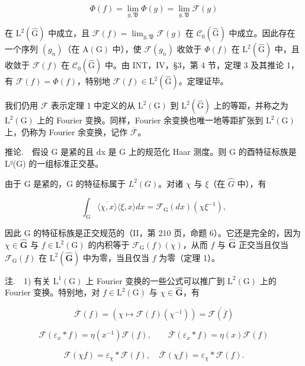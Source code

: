 \[
\Phi (f) = \lim _ {g, \mathfrak {B}} \Phi (g) = \lim _ {g, \mathfrak {B}} \mathcal {F} (g)
\]

在 \(\mathrm{L}^{2}(\widehat{\mathrm{G}})\) 中成立，且 \(\mathcal{F}(f)=\lim_{g,\mathfrak{B}}\mathcal{F}(g)\) 在 \(\mathcal{C}_{0}(\widehat{\mathrm{G}})\) 中成立。因此存在一个序列 \((g_{n})\)（在 \(\mathrm{A}(\mathrm{G})\) 中），使 \(\mathcal{F}(g_{n})\) 收敛于 \(\Phi(f)\) 在 \(\mathrm{L}^{2}(\widehat{\mathrm{G}})\) 中，且收敛于 \(\mathcal{F}(f)\) 在 \(\mathcal{C}_{0}(\widehat{\mathrm{G}})\) 中。由 INT，IV，§3，第 4 节，定理 3 及其推论 1，有 \(\mathcal{F}(f)=\Phi(f)\)，特别地 \(\mathcal{F}(f)\in\mathrm{L}^{2}(\widehat{\mathrm{G}})\)。定理证毕。

我们仍用 \(\mathcal{F}\) 表示定理 1 中定义的从 \(\mathrm{L}^2 (\mathrm{G})\) 到 \(\mathrm{L}^2 (\widehat{\mathrm{G}})\) 上的等距，并称之为 \(\mathrm{L}^2 (\mathrm{G})\) 上的 Fourier 变换。同样，Fourier 余变换也唯一地等距扩张到 \(\mathrm{L}^2 (\mathrm{G})\) 上，仍称为 Fourier 余变换，记作 \(\overline{\mathcal{F}}\)。

推论.　假设 G 是紧的且 dx 是 G 上的规范化 Haar 测度。则 G 的酉特征标族是 L²(G) 的一组标准正交基。

由于 G 是紧的，G 的特征标属于 \(L^{2}(G)\)。对诸 \(\chi\) 与 \(\xi\)（在 \(\widehat{G}\) 中），有

\[
\int_ {\mathrm{G}} \overline {{\langle \chi , x \rangle}} \langle \xi , x \rangle d x = \mathcal {F} _ {\mathrm{G}} (d x) (\chi \xi^ {- 1}),
\]

因此 G 的特征标族是正交规范的（II，第 210 页，命题 6）。它还是完全的，因为 \(\chi \in \widehat{\mathbf{G}}\) 与 \(f \in \mathrm{L}^2(\mathrm{G})\) 的内积等于 \(\mathcal{F}_{\mathrm{G}}(f)(\chi)\)，从而 \(f\) 与 \(\widehat{\mathbf{G}}\) 正交当且仅当 \(\mathcal{F}_{\mathrm{G}}(f)\) 在 \(\mathrm{L}^2(\widehat{\mathbf{G}})\) 中为零，当且仅当 \(f\) 为零（定理 1）。

注.　1) 有关 \(\mathrm{L}^{1}(\mathrm{G})\) 上 Fourier 变换的一些公式可以推广到 \(\mathrm{L}^{2}(\mathrm{G})\) 上的 Fourier 变换。特别地，对 \(f \in \mathrm{L}^{2}(\mathrm{G})\) 与 \(\chi \in \widehat{\mathbf{G}}\)，有

\[
\overline {{\mathcal {F}}} (f) = (\chi \mapsto \mathcal {F} (f) (\chi^ {- 1})) = \overline {{\mathcal {F} (\overline {{f}})}}
\]

\[
\mathcal {F} (\varepsilon_ {x} * f) = \eta (x ^ {- 1}) \mathcal {F} (f), \qquad \overline {{\mathcal {F}}} (\varepsilon_ {x} * f) = \eta (x) \mathcal {F} (f)
\]

\[
\mathcal {F} (\chi f) = \varepsilon_ {\chi} * \mathcal {F} (f), \quad \overline {{\mathcal {F}}} (\chi f) = \varepsilon_ {\chi} * \mathcal {F} (f).
\]

